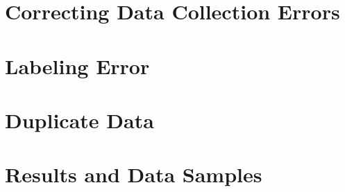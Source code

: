 
\section{Correcting Data Collection Errors}





\section{Labeling Error}


\section{Duplicate Data}

\section{Results and Data Samples}















